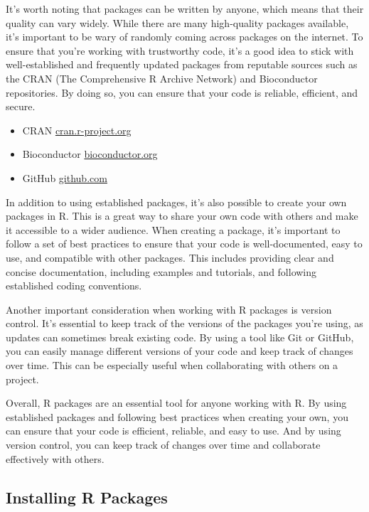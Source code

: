 \documentclass[
]{book}
\providecommand{\tightlist}{%
  \setlength{\itemsep}{0pt}\setlength{\parskip}{0pt}}
\begin{document}
It's worth noting that packages can be written by anyone, which means that their quality can vary widely. While there are many high-quality packages available, it's important to be wary of randomly coming across packages on the internet. To ensure that you're working with trustworthy code, it's a good idea to stick with well-established and frequently updated packages from reputable sources such as the CRAN (The Comprehensive R Archive Network) and Bioconductor repositories. By doing so, you can ensure that your code is reliable, efficient, and secure.

\begin{itemize}
\tightlist
\item
  CRAN \href{https://cran.r-project.org/}{cran.r-project.org}
\item
  Bioconductor \href{https://bioconductor.org/}{bioconductor.org}
\item
  GitHub \href{https://github.com/}{github.com}
\end{itemize}

In addition to using established packages, it's also possible to create your own packages in R. This is a great way to share your own code with others and make it accessible to a wider audience. When creating a package, it's important to follow a set of best practices to ensure that your code is well-documented, easy to use, and compatible with other packages. This includes providing clear and concise documentation, including examples and tutorials, and following established coding conventions.

Another important consideration when working with R packages is version control. It's essential to keep track of the versions of the packages you're using, as updates can sometimes break existing code. By using a tool like Git or GitHub, you can easily manage different versions of your code and keep track of changes over time. This can be especially useful when collaborating with others on a project.

Overall, R packages are an essential tool for anyone working with R. By using established packages and following best practices when creating your own, you can ensure that your code is efficient, reliable, and easy to use. And by using version control, you can keep track of changes over time and collaborate effectively with others.

\hypertarget{installing-r-packages}{%
\subsection{Installing R Packages}\label{installing-r-packages}}
\end{document}
